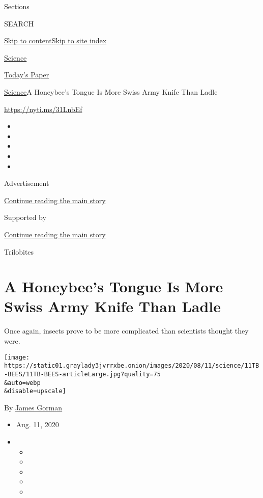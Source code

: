 Sections

SEARCH

\protect\hyperlink{site-content}{Skip to
content}\protect\hyperlink{site-index}{Skip to site index}

\href{https://www.nytimes3xbfgragh.onion/section/science}{Science}

\href{https://myaccount.nytimes3xbfgragh.onion/auth/login?response_type=cookie\&client_id=vi}{}

\href{https://www.nytimes3xbfgragh.onion/section/todayspaper}{Today's
Paper}

\href{/section/science}{Science}\textbar{}A Honeybee's Tongue Is More
Swiss Army Knife Than Ladle

\url{https://nyti.ms/31LnbEf}

\begin{itemize}
\item
\item
\item
\item
\item
\end{itemize}

Advertisement

\protect\hyperlink{after-top}{Continue reading the main story}

Supported by

\protect\hyperlink{after-sponsor}{Continue reading the main story}

Trilobites

\hypertarget{a-honeybees-tongue-is-more-swiss-army-knife-than-ladle}{%
\section{A Honeybee's Tongue Is More Swiss Army Knife Than
Ladle}\label{a-honeybees-tongue-is-more-swiss-army-knife-than-ladle}}

Once again, insects prove to be more complicated than scientists thought
they were.

\texttt{[image: https://static01.graylady3jvrrxbe.onion/images/2020/08/11/science/11TB-BEES/11TB-BEES-articleLarge.jpg?quality=75\\\&auto=webp\\\&disable=upscale]}

By \href{https://www.nytimes3xbfgragh.onion/by/james-gorman}{James
Gorman}

\begin{itemize}
\item
  Aug. 11, 2020
\item
  \begin{itemize}
  \item
  \item
  \item
  \item
  \item
  \end{itemize}
\end{itemize}

